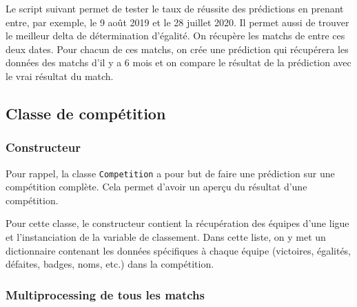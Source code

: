 \documentclass[a4paper,14pt]{extarticle}
\begin{document}
{Le script suivant permet de tester le taux de réussite des prédictions en prenant entre, par exemple, le 9 août 2019 et le 28 juillet 2020. Il permet aussi de trouver le meilleur delta de détermination d'égalité. On récupère les matchs de entre ces deux dates. Pour chacun de ces matchs, on crée une prédiction qui récupérera les données des matchs d'il y a 6 mois et on compare le résultat de la prédiction avec le vrai résultat du match.


\subsection{Classe de compétition}

\subsubsection{Constructeur}

Pour rappel, la classe \texttt{Competition} a pour but de faire une prédiction sur une compétition complète. Cela permet d'avoir un aperçu du résultat d'une compétition.

Pour cette classe, le constructeur contient la récupération des équipes d'une ligue et l'instanciation de la variable de classement. Dans cette liste, on y met un dictionnaire contenant les données spécifiques à chaque équipe (victoires, égalités, défaites, badges, noms, etc.) dans la compétition.


\subsubsection{Multiprocessing de tous les matchs}
\label{multiprocessing}

}
\end{document}
